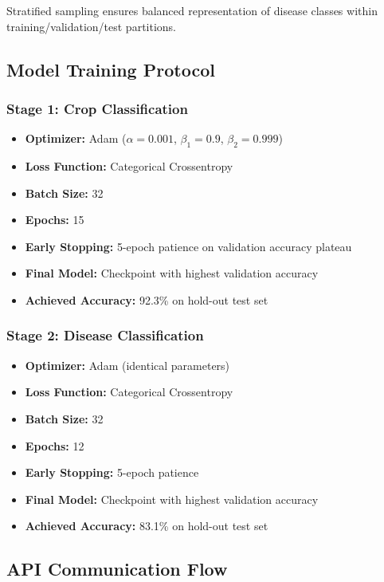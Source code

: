\documentclass[conference]{IEEEtran}
\begin{document}
Stratified sampling ensures balanced representation of disease classes within training/validation/test partitions.

\subsection{Model Training Protocol}

\subsubsection{Stage 1: Crop Classification}

\begin{itemize}
\item \textbf{Optimizer:} Adam ($\alpha=0.001$, $\beta_1=0.9$, $\beta_2=0.999$)
\item \textbf{Loss Function:} Categorical Crossentropy
\item \textbf{Batch Size:} 32
\item \textbf{Epochs:} 15
\item \textbf{Early Stopping:} 5-epoch patience on validation accuracy plateau
\item \textbf{Final Model:} Checkpoint with highest validation accuracy
\item \textbf{Achieved Accuracy:} 92.3\% on hold-out test set
\end{itemize}

\subsubsection{Stage 2: Disease Classification}

\begin{itemize}
\item \textbf{Optimizer:} Adam (identical parameters)
\item \textbf{Loss Function:} Categorical Crossentropy
\item \textbf{Batch Size:} 32
\item \textbf{Epochs:} 12
\item \textbf{Early Stopping:} 5-epoch patience
\item \textbf{Final Model:} Checkpoint with highest validation accuracy
\item \textbf{Achieved Accuracy:} 83.1\% on hold-out test set
\end{itemize}

\subsection{API Communication Flow}
\end{document}
